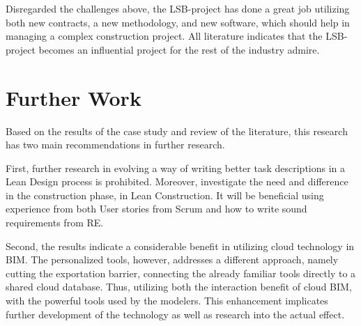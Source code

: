 Disregarded the challenges above, the LSB-project has done a great job utilizing both new contracts, a new methodology, and new software, which should help in managing a complex construction project. All literature indicates that the LSB-project becomes an influential project for the rest of the industry admire. 

\section{Further Work} \label{sec:further_research}
Based on the results of the case study and review of the literature, this research has two main recommendations in further research.

First, further research in evolving a way of writing better task descriptions in a Lean Design process is prohibited. Moreover, investigate the need and difference in the construction phase, in Lean Construction. It will be beneficial using experience from both User stories from Scrum and how to write sound requirements from RE.
	 
Second, the results indicate a considerable benefit in utilizing cloud technology in BIM. The personalized tools, however, addresses a different approach, namely cutting the exportation barrier, connecting the already familiar tools directly to a shared cloud database. Thus, utilizing both the interaction benefit of cloud BIM, with the powerful tools used by the modelers. This enhancement implicates further development of the technology as well as research into the actual effect.

\cleardoublepage